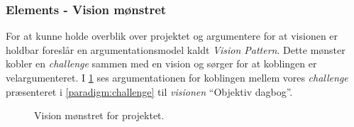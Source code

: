 \subsubsection{Elements - Vision mønstret}
For at kunne holde overblik over projektet og argumentere for at visionen er holdbar foreslår \citet[Kapitel 15 - Project]{art:essence} en argumentationsmodel kaldt \emph{Vision Pattern}. 
Dette mønster kobler en \emph{challenge} sammen med en vision og sørger for at koblingen er velargumenteret.
I \cref{fig:visionpattern} ses argumentationen for koblingen mellem vores \textit{challenge} præsenteret i \cref{paradigm:challenge} til \textit{visionen} ``Objektiv dagbog''.

\begin{figure}[h]
	\centering
	\resizebox{\columnwidth}{!}{
		}
	\caption{Vision mønstret for projektet.}
	\label{fig:visionpattern}
\end{figure}

